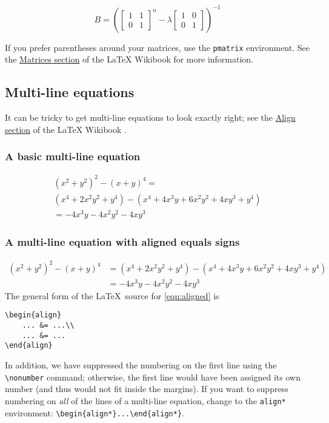 \documentclass[11pt]{amsart}
\theoremstyle{definition}                  %
\theoremstyle{remark}                       %
\numberwithin{equation}{section}
\begin{document}
\begin{equation}
B= \left( \begin{bmatrix}1&1\\0&1\end{bmatrix}^n- \lambda \begin{bmatrix}1 &0\\0&1\end{bmatrix}  \right)^{-1}
\end{equation}

If you prefer parentheses around your matrices, use the \verb,pmatrix,
environment. See the \href{https://en.wikibooks.org/wiki/LaTeX/Mathematics#Matrices_and_arrays}{Matrices section} of  the LaTeX Wikibook \cite{wikibook} for more information.

\subsection{Multi-line equations}
It can be tricky to get multi-line equations to look exactly
right; see the \href{https://en.wikibooks.org/wiki/LaTeX/Advanced_Mathematics#align_and_align*}{Align section} of the LaTeX Wikibook \cite{wikibook}.


\subsubsection{A  basic multi-line equation}
 \begin{multline}
 (x^2+y^2)^2 - (x+y)^4 = \\
(x^4+2x^2y^2+y^4)-(x^4+4x^3y+6x^2y^2+4xy^3+y^4) \\
  = -4x^3y - 4 x^2y^2 - 4xy^3 
 \end{multline}
\subsubsection{A multi-line equation with aligned equals signs}
 \begin{align}
 (x^2+y^2)^2 - (x+y)^4 &=  (x^4+2x^2y^2+y^4)-(x^4+4x^3y+6x^2y^2+4xy^3+y^4) \nonumber\\ 
  &= -4x^3y - 4 x^2y^2 - 4xy^3 \label{eqn:aligned}
 \end{align}
The general form of the \LaTeX\ source for \eqref{eqn:aligned} is 
\begin{center}
\begin{minipage}{1in}
\begin{verbatim}
\begin{align}
	... &= ...\\
	... &= ...
\end{align}
\end{verbatim}
\end{minipage}
\end{center}
In addition, we have suppressed the numbering on the first line using the \verb+\nonumber+ command; otherwise, the first line would have been assigned its own number (and thus would not fit inside the margins). 
If you want to suppress numbering on \emph{all} of the lines of a multi-line equation, change to the \texttt{align*} environment: \verb+\begin{align*}...\end{align*}+.
\end{document}
